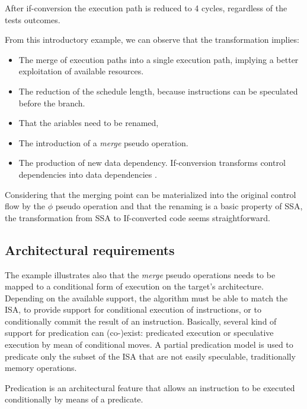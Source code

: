 After if-conversion the execution path is reduced to 4 cycles, regardless of the tests outcomes. 

From this introductory example, we can observe that the transformation implies:

\begin{itemize}
\item The merge of execution paths into a single execution path, implying a  better exploitation of available resources.  
\item The reduction of the schedule length, because instructions can be speculated before the branch.
\item That the ariables need to be renamed, 
\item The introduction of a \textit{merge} pseudo operation.
\item The production of new data dependency. If-conversion transforms control dependencies into data dependencies \cite{Allen:1983:CCD:567067.567085}. 
\end{itemize}

Considering that the merging point can be materialized into the original control flow by the $\phi$ pseudo operation and that the renaming is a basic property of SSA, the transformation from SSA to If-converted code seems straightforward.

\subsection{Architectural requirements}
The example illustrates also that the \textit{merge} pseudo operations needs to be mapped to a conditional form of execution on the target's architecture. Depending on the available support, the algorithm must be able to match the ISA, to provide support for conditional execution of instructions, or to conditionally commit the result of an instruction.
Basically, several kind of support for predication can (co-)exist: predicated execution  or speculative execution by mean of conditional moves. A partial predication model is used to predicate only the subset of the ISA that are not easily speculable, traditionally memory operations.

Predication is an architectural feature that allows an instruction to be executed conditionally by means of a predicate.

